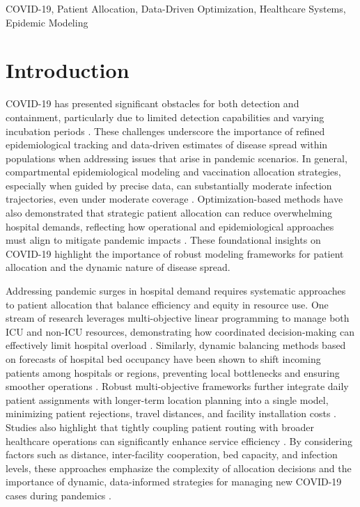 \documentclass{article}
\begin{document}
\begin{ieomkeywords}
COVID-19, Patient Allocation, Data-Driven Optimization, Healthcare Systems, Epidemic Modeling
\end{ieomkeywords}

\section{Introduction}
COVID-19 has presented significant obstacles for both detection and containment, particularly due to limited detection capabilities and varying incubation periods \parencite{li2020modeling, lauer2020incubation, meyerowitz2020systematic}. These challenges underscore the importance of refined epidemiological tracking and data-driven estimates of disease spread within populations when addressing issues that arise in pandemic scenarios. In general, compartmental epidemiological modeling and vaccination allocation strategies, especially when guided by precise data, can substantially moderate infection trajectories, even under moderate coverage \parencite{waseel2024assessing}. Optimization-based methods have also demonstrated that strategic patient allocation can reduce overwhelming hospital demands, reflecting how operational and epidemiological approaches must align to mitigate pandemic impacts \parencite{sarkar2021covid}. These foundational insights on COVID-19 highlight the importance of robust modeling frameworks for patient allocation and the dynamic nature of disease spread.

Addressing pandemic surges in hospital demand requires systematic approaches to patient allocation that balance efficiency and equity in resource use. One stream of research leverages multi-objective linear programming to manage both ICU and non-ICU resources, demonstrating how coordinated decision-making can effectively limit hospital overload \parencite{aydin2022analyses}. Similarly, dynamic balancing methods based on forecasts of hospital bed occupancy have been shown to shift incoming patients among hospitals or regions, preventing local bottlenecks and ensuring smoother operations \parencite{dijkstra2023dynamic}. Robust multi-objective frameworks further integrate daily patient assignments with longer-term location planning into a single model, minimizing patient rejections, travel distances, and facility installation costs \parencite{eriskin2024robust}. Studies also highlight that tightly coupling patient routing with broader healthcare operations can significantly enhance service efficiency \parencite{yinusa2023optimizing, shi2023data}. By considering factors such as distance, inter-facility cooperation, bed capacity, and infection levels, these approaches emphasize the complexity of allocation decisions and the importance of dynamic, data-informed strategies for managing new COVID-19 cases during pandemics \parencite{sarkar2021covid}.
\end{document}
